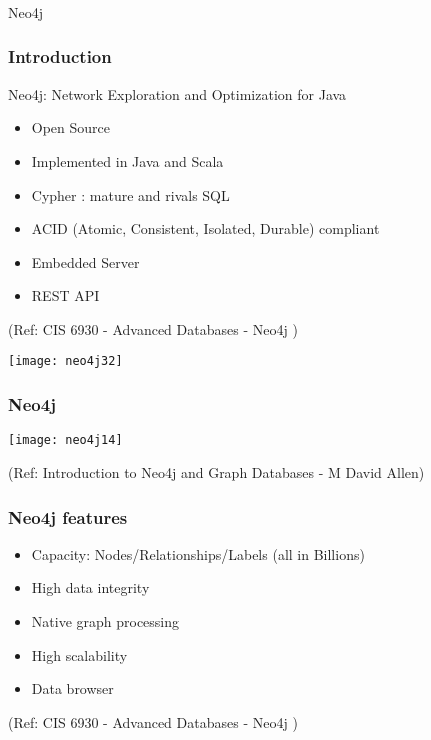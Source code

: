 \begin{frame}[fragile]\frametitle{}
\begin{center}
{\Large Neo4j}
\end{center}
\end{frame}


\begin{frame}\frametitle{Introduction}

Neo4j: Network Exploration and Optimization for Java

\begin{itemize}
\item Open Source
\item Implemented in Java and Scala
\item Cypher : mature and rivals SQL
\item ACID (Atomic, Consistent, Isolated, Durable) compliant
\item Embedded Server
\item REST API
\end{itemize}

{\tiny (Ref: CIS 6930 - Advanced Databases - Neo4j )}


\begin{center}
\texttt{[image: neo4j32]}
\end{center}	

\end{frame}


\begin{frame}[fragile]\frametitle{Neo4j}

\begin{center}
\texttt{[image: neo4j14]}
\end{center}	  

{\tiny (Ref: Introduction to Neo4j and Graph Databases
 - M David Allen)}

\end{frame}

\begin{frame}\frametitle{Neo4j features}

\begin{itemize}
\item Capacity: Nodes/Relationships/Labels (all in Billions)
\item High data integrity
\item Native graph processing
\item High scalability
\item Data browser
\end{itemize}

{\tiny (Ref: CIS 6930 - Advanced Databases - Neo4j )}
\end{frame}

